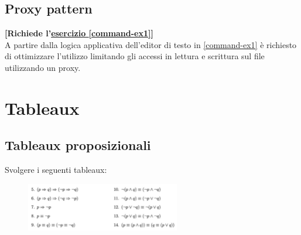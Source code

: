 \documentclass[12pt,a4paper]{article}
\begin{document}
    \subsection{Proxy pattern}\label{pattern:proxy}
    \begin{Exercise}
    \small\textbf{[Richiede l'\hyperref[command-ex1]{esercizio \ref{command-ex1}}]}\\
    A partire dalla logica applicativa dell'editor di testo in \hyperref[command-ex1]{\ref{command-ex1}} è richiesto di ottimizzare l'utilizzo limitando gli accessi in lettura e scrittura sul file utilizzando un proxy.
    \end{Exercise}
\clearpage

\section{Tableaux}
    \subsection{Tableaux proposizionali}
    \begin{Exercise}
    Svolgere i seguenti tableaux:
        \begin{figure}[h!]
            \centering
            \includegraphics[width=0.6\textwidth]{images/es_tableaux.jpeg}
            \label{fig:enter-label}
        \end{figure}
    \end{Exercise}
\end{document}
